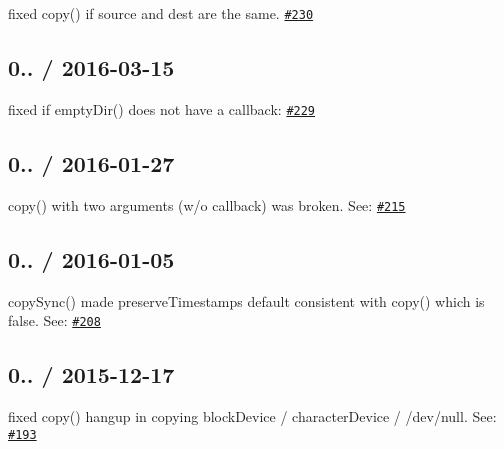 \begin{DoxyItemize}
\item fixed {\ttfamily copy()} if source and dest are the same. \href{https://github.com/jprichardson/node-fs-extra/pull/230}{\tt \#230}
\end{DoxyItemize}

\subsection*{0.. / 2016-\/03-\/15 }


\begin{DoxyItemize}
\item fixed if {\ttfamily empty\+Dir()} does not have a callback\+: \href{https://github.com/jprichardson/node-fs-extra/pull/229}{\tt \#229}
\end{DoxyItemize}

\subsection*{0.. / 2016-\/01-\/27 }


\begin{DoxyItemize}
\item {\ttfamily copy()} with two arguments (w/o callback) was broken. See\+: \href{https://github.com/jprichardson/node-fs-extra/pull/215}{\tt \#215}
\end{DoxyItemize}

\subsection*{0.. / 2016-\/01-\/05 }


\begin{DoxyItemize}
\item {\ttfamily copy\+Sync()} made {\ttfamily preserve\+Timestamps} default consistent with {\ttfamily copy()} which is {\ttfamily false}. See\+: \href{https://github.com/jprichardson/node-fs-extra/pull/208}{\tt \#208}
\end{DoxyItemize}

\subsection*{0.. / 2015-\/12-\/17 }


\begin{DoxyItemize}
\item fixed {\ttfamily copy()} hangup in copying block\+Device / character\+Device / {\ttfamily /dev/null}. See\+: \href{https://github.com/jprichardson/node-fs-extra/issues/193}{\tt \#193}
\end{DoxyItemize}

